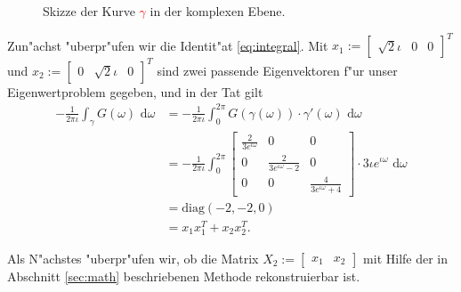 \begin{figure}[h!]
	\center
	\caption{Skizze der Kurve \textcolor{red}{$\gamma$} in der komplexen Ebene.}
\end{figure}

Zun"achst "uberpr"ufen wir
die Identit"at \eqref{eq:integral}. Mit $x_1 := \begin{bmatrix} \sqrt2 \iota & 0 & 0
\end{bmatrix}^T$
und $x_2 := \begin{bmatrix} 0 & \sqrt2 \iota &0\end{bmatrix}^T$ sind zwei passende
Eigenvektoren f"ur unser Eigenwertproblem gegeben, und in der Tat gilt
\begin{align*}
-\frac{1}{2\pi\iota} \int_\gamma G(\omega) \text{ d}\omega &=
-\frac{1}{2\pi\iota}\int_0^{2\pi} G(\gamma(\omega))\cdot \gamma'(\omega)
\text{ d}\omega \\
&= -\frac{1}{2\pi\iota}\int_0^{2\pi} \begin{bmatrix} \frac{2}{3e^{\iota\omega}}&0&0\\
0 & \frac{2}{3e^{\iota\omega}-2}&0\\
0&0&\frac{4}{3e^{\iota\omega}+4}
 \end{bmatrix}\cdot 3\iota e^{\iota\omega}
\text{ d}\omega \\
&= \text{diag}(-2,-2,0) \\
&= x_1 x_1^{T} + x_2 x_2^T.
\end{align*}

Als N"achstes "uberpr"ufen wir, ob die Matrix $X_2 := \begin{bmatrix} x_1 & x_2\end{bmatrix}$ mit Hilfe der in Abschnitt \ref{sec:math} beschriebenen Methode rekonstruierbar ist.\\

